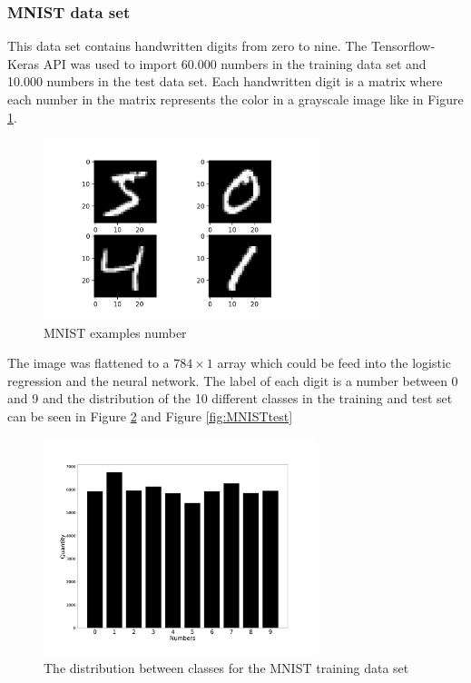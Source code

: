 \documentclass[twocolumn]{cinc}
\begin{document}
\subsubsection{MNIST data set}
This data set contains handwritten digits from zero to nine.
The Tensorflow-Keras API \cite{chollet_keras_2015,martin_abadi_tensorflow_2015} was used to import 60.000 numbers in the training data set and 10.000 numbers in the test data set. Each handwritten digit is a matrix where each number in the matrix represents the color in a grayscale image like in Figure \ref{fig:MNISTnumbers}.
\begin{figure}[!htb]
\includegraphics[width=7.9cm]{Figures/MNIST_number.png}
\caption{MNIST examples number}
\label{fig:MNISTnumbers}
\end{figure}
The image was flattened to a $784 \times 1$ array which could be feed into the logistic regression and the neural network. The label of each digit is a number between 0 and 9 and the distribution of the 10 different classes in the training and test set can be seen in Figure \ref{fig:MNISTtrain} and Figure \ref{fig:MNISTtest}


\begin{figure}[!htbp]
\includegraphics[width=7.9cm]{Figures/MNIST_train_data.png}
\caption{The distribution between classes for the MNIST training data set}
\label{fig:MNISTtrain}
\end{figure}
\end{document}
